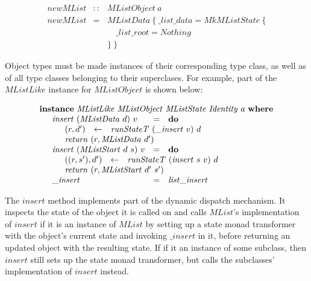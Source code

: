 \documentclass[runningheads,a4paper]{llncs}
\begin{document}
\begin{displaymath}
\begin{array}{lcl}
\mathit{newMList} & :: & \mathit{MListObject}~a \\
\mathit{newMList} & = & \mathit{MListData}~\{~\_\mathit{list}\_\mathit{data} = \mathit{MkMListState}~\{\\ 
&& \quad \_\mathit{list}\_\mathit{root} = \mathit{Nothing}\\
&& \}~\}
\end{array}
\end{displaymath}

Object types must be made instances of their corresponding type class, as well as of all type classes belonging to their superclases. For example, part of the $\mathit{MListLike}$ instance for $\mathit{MListObject}$ is shown below:

\begin{displaymath}
\begin{array}{l}
\mathbf{instance}~\mathit{MListLike}~\mathit{MListObject}~\mathit{MListState}~\mathit{Identity}~a~\mathbf{where} \\
\quad \begin{array}{lcl}
\mathit{insert}~(\mathit{MListData}~d)~v & = & \mathbf{do} \\
\multicolumn{3}{l}{\quad \begin{array}{lcl}
(r,d') & \leftarrow & \mathit{runStateT}~(\_\mathit{insert}~v)~d \\
\multicolumn{3}{l}{\mathit{return}~(r,\mathit{MListData}~d')}
\end{array}} \\
\mathit{insert}~(\mathit{MListStart}~d~s)~v & = & \mathbf{do} \\
\multicolumn{3}{l}{\quad \begin{array}{lcl}
((r,s'),d') & \leftarrow & \mathit{runStateT}~(\mathit{insert}~s~v)~d \\
\multicolumn{3}{l}{\mathit{return}~(r,\mathit{MListStart}~d'~s')}
\end{array}} \\
\_\mathit{insert} & = & \mathit{list}\_\mathit{insert}
\end{array}
\end{array}
\end{displaymath}

The $\mathit{insert}$ method implements part of the dynamic dispatch mechanism. It inspects the state of the object it is called on and calls $\mathit{MList}$'s implementation of $\mathit{insert}$ if it is an instance of $\mathit{MList}$ by setting up a state monad transformer with the object's current state and invoking $\_\mathit{insert}$ in it, before returning an updated object with the resulting state. If if it an instance of some subclass, then $\mathit{insert}$ still sets up the state monad transformer, but calls the subclasses' implementation of $\mathit{insert}$ instead.
\end{document}
